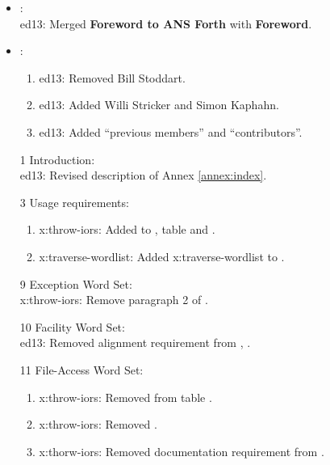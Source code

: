 	\begin{itemize}
	\item {}:							%
		~\\ \textsf{ed13}: Merged \textbf{Foreword to ANS Forth} with \textbf{Foreword}.

	\item {}:							%
		\begin{enumerate}
		\item \textsf{ed13}: Removed Bill Stoddart.
		\item \textsf{ed13}: Added Willi Stricker and Simon Kaphahn.
		\item \textsf{ed13}: Added ``previous members'' and ``contributors''.
		\end{enumerate}

	\item[1] Introduction:							%
		~ \\
		\textsf{ed13}: Revised description of Annex \ref{annex:index}.

	\item[3] Usage requirements:					%
		\begin{enumerate}
		\item \textsf{x:throw-iors}:
			Added  to , table 
			and .
		\item \textsf{x:traverse-wordlist}:
			Added \textsf{x:traverse-wordlist} to .
		\end{enumerate}

	\item[9] Exception Word Set:					%
		~ \\
		\textsf{x:throw-iors}: Remove paragraph 2 of .

	\item[10] Facility Word Set:					%
		~ \\
		\textsf{ed13}: Removed alignment requirement from , .

	\item[11] File-Access Word Set:				%
		\begin{enumerate}
		\item \textsf{x:throw-iors}: Removed  from table .
		\item \textsf{x:throw-iors}: Removed .
		\item \textsf{x:thorw-iors}: Removed  documentation requirement from .
		\end{enumerate}


\end{itemize}
